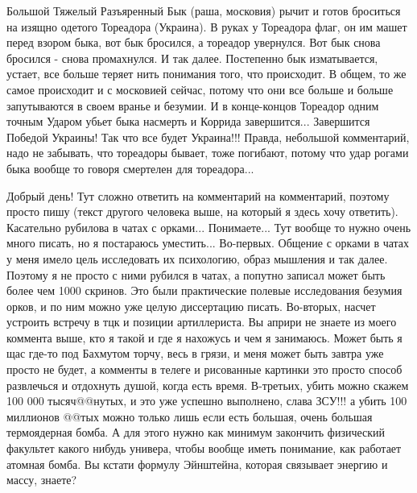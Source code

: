 Большой Тяжелый Разъяренный Бык (раша, московия) рычит и готов броситься на
изящно одетого Тореадора (Украина). В руках у Тореадора флаг, он им машет перед
взором быка, вот бык бросился, а тореадор увернулся. Вот бык снова бросился -
снова промахнулся. И так далее. Постепенно бык изматывается, устает, все больше
теряет нить понимания того, что происходит. В общем, то же самое происходит и с
московией сейчас, потому что они все больше и больше запутываются в своем
вранье и безумии. И в конце-концов Тореадор одним точным Ударом убьет быка
насмерть и Коррида завершится... Завершится Победой Украины! Так что все будет
Украина!!! Правда, небольшой комментарий, надо не забывать, что тореадоры
бывает, тоже погибают, потому что удар рогами быка вообще то говоря смертелен
для тореадора...

Добрый день! Тут сложно ответить на комментарий на комментарий, поэтому просто
пишу (текст другого человека выше, на который я здесь хочу ответить).
Касательно рубилова в чатах с орками... Понимаете... Тут вообще то нужно очень
много писать, но я постараюсь уместить... Во-первых. Общение с орками в чатах у
меня имело цель исследовать их психологию, образ мышления и так далее. Поэтому
я не просто с ними рубился в чатах, а попутно записал может быть более чем 1000
скринов. Это были практические полевые исследования безумия орков, и по ним
можно уже целую диссертацию писать. Во-вторых, насчет устроить встречу в тцк и
позиции артиллериста. Вы априри не знаете из моего коммента выше, кто я такой и
где я нахожусь и чем я занимаюсь. Может быть я щас где-то под Бахмутом торчу,
весь в грязи, и меня может быть завтра уже просто не будет, а комменты в телеге
и рисованные картинки это просто способ развлечься и отдохнуть душой, когда
есть время. В-третьих, убить можно скажем 100 000 тысяч@@нутых, и это уже
успешно выполнено, слава ЗСУ!!! а убить 100 миллионов @@тых можно только лишь
если есть большая, очень большая термоядерная бомба. А для этого нужно как
минимум закончить физический факультет какого нибудь универа, чтобы вообще
иметь понимание, как работает атомная бомба. Вы кстати формулу Эйнштейна,
которая связывает энергию и массу, знаете?

